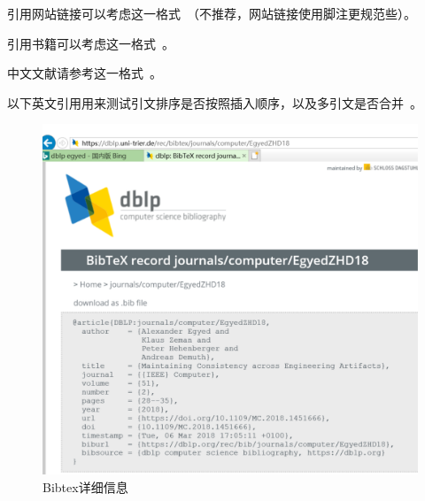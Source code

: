 引用网站链接可以考虑这一格式~\cite{GanttSystemWeb}（不推荐，网站链接使用脚注更规范些）。

引用书籍可以考虑这一格式~\cite{Pohl2010Requirements}。

中文文献请参考这一格式~\cite{cyg2006}。

以下英文引用用来测试引文排序是否按照插入顺序，以及多引文是否合并~\cite{DBLP:journals/computer/EgyedZHD18, DBLP:journals/ml/TingZCZWZ19}。

\begin{figure}[htb]
  \centering
  \includegraphics[width=5in]{figure/chapter7/bibtexDetail.pdf}
  \caption{Bibtex详细信息}
  \label{fig:bibtexDetailCH7}
\end{figure}
